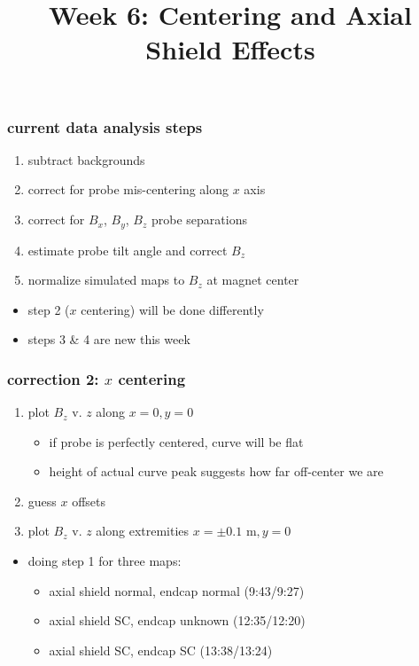 \documentclass{beamer}
\begin{document}
\title{Week 6: Centering and Axial Shield Effects}
\maketitle

\begin{frame}
\frametitle{current data analysis steps}

    \begin{enumerate}
    \item subtract backgrounds
    \item correct for probe mis-centering along $x$ axis
    \item correct for $B_x$, $B_y$, $B_z$ probe separations
    \item estimate probe tilt angle and correct $B_z$
    \item normalize simulated maps to $B_z$ at magnet center
    \end{enumerate}

    \begin{itemize}
    \item step 2 ($x$ centering) will be done differently
    \item steps 3 \& 4 are new this week
    \end{itemize}

\end{frame}


\begin{frame}
\frametitle{correction 2: $x$ centering}

    \begin{enumerate}
    \item plot $B_z$ v. $z$ along $x = 0, y = 0$
        \begin{itemize}
        \item if probe is perfectly centered, curve will be flat
        \item height of actual curve peak suggests how far off-center we are
        \end{itemize}
    \item guess $x$ offsets
    \item plot $B_z$ v. $z$ along extremities $x = \pm 0.1 \text{ m}, y = 0$
    \end{enumerate}

    \begin{itemize}
    \item doing step 1 for three maps:
        \begin{itemize}
            \item axial shield normal, endcap normal (9:43/9:27)
            \item axial shield SC, endcap unknown (12:35/12:20)
            \item axial shield SC, endcap SC (13:38/13:24)
        \end{itemize}
    \end{itemize}

\end{frame}
\end{document}
